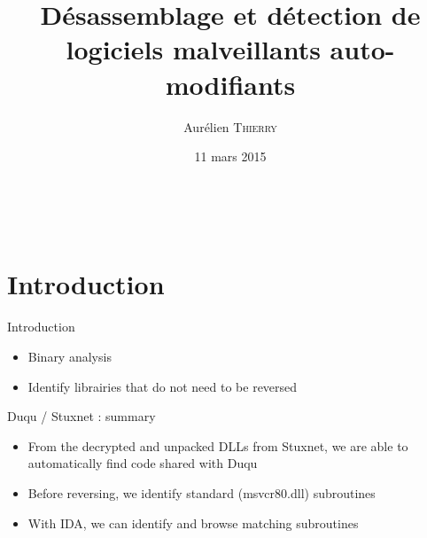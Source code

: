 \documentclass{beamer}
\title[Désassemblage et détection de logiciels malveillants auto-modifiants]{Désassemblage et détection de logiciels malveillants auto-modifiants}
\author{Aurélien \textsc{Thierry}}%
\date{11 mars 2015}
\begin{document}
\makeatletter
  \gdef\inserttotalframenumber{\inserttotalframenumbernew}
\makeatother


\begin{frame}[plain]
\titlepage
\begin{figure}[ht]
\begin{center}
  \quad
  \
\quad
\end{center}
\label{fig:CFGConstrNorm}
\end{figure}
\end{frame}

\section{Introduction}

 \begin{frame}{Introduction}

\begin{itemize}
 \item Binary analysis
 \begin{figure}
\end{figure}
 \item<2-> Identify librairies that do not need to be reversed
\end{itemize}
{}
\end{frame}



\begin{frame}{Duqu / Stuxnet : summary}
\begin{itemize}
 \item From the decrypted and unpacked DLLs from Stuxnet, we are able to automatically find code shared with Duqu
 \item Before reversing, we identify standard (msvcr80.dll) subroutines
 \item With IDA, we can identify and browse matching subroutines
\end{itemize}
\end{frame}
\end{document}
